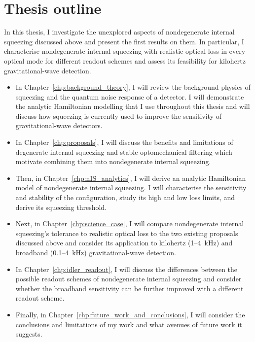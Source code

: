 

\section{Thesis outline}
\label{sec:thesis_outline}


In this thesis, I investigate the unexplored aspects of nondegenerate internal squeezing discussed above and present the first results on them. In particular, I characterise nondegenerate internal squeezing with realistic optical loss in every optical mode for different readout schemes and assess its feasibility for kilohertz gravitational-wave detection.
\begin{itemize}
\itemsep0em 
\item In Chapter~\ref{chp:background_theory}, I will review the background physics of squeezing and the quantum noise response of a detector. I will demonstrate the analytic Hamiltonian modelling that I use throughout this thesis and will discuss how squeezing is currently used to improve the sensitivity of gravitational-wave detectors. %
\item In Chapter~\ref{chp:proposals}, I will discuss the benefits and limitations of degenerate internal squeezing and stable optomechanical filtering which motivate combining them into nondegenerate internal squeezing.
\item Then, in Chapter~\ref{chp:nIS_analytics}, I will derive an analytic Hamiltonian model of nondegenerate internal squeezing. I will characterise the sensitivity and stability of the configuration, study its high and low loss limits, and derive its squeezing threshold. %
\item Next, in Chapter~\ref{chp:science_case}, I will compare nondegenerate internal squeezing's tolerance to realistic optical loss to the two existing proposals discussed above and consider its application to kilohertz (1--4~kHz) and broadband (0.1--4~kHz) gravitational-wave detection.
\item In Chapter~\ref{chp:idler_readout}, I will discuss the differences between the possible readout schemes of nondegenerate internal squeezing and consider whether the broadband sensitivity can be further improved with a different readout scheme. %
\item Finally, in Chapter~\ref{chp:future_work_and_conclusions}, I will consider the conclusions and limitations of my work and what avenues of future work it suggests.
\end{itemize}

